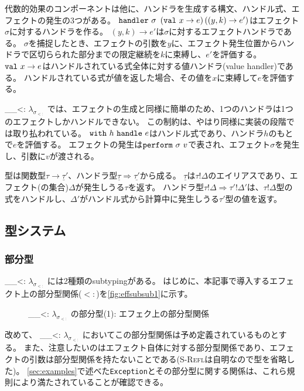 \documentclass{ltjsarticle}
\def\effsub{
  \ifmmode
    \lambda_{\sigma_{<:}}
  \else
    $\lambda_{\sigma_{<:}}$
  \fi
}
\begin{document}
代数的効果のコンポーネントは他に、ハンドラを生成する構文、ハンドル式、エフェクトの発生の3つがある。
$\handlerK \sigma\ \left(\valK x \rightarrow e\right) \left(\left(y, k\right) \rightarrow e'\right)$はエフェクト$\sigma$に対するハンドラを作る。
$\left(y, k\right)\rightarrow e'$は$\sigma$に対するエフェクトハンドラである。
$\sigma$を捕捉したとき、エフェクトの引数を$y$に、エフェクト発生位置からハンドラで区切らられた部分までの限定継続を$k$に束縛し、$e'$を評価する。
$\valK x \rightarrow e$はハンドルされている式全体に対する値ハンドラ(value handler)である。
ハンドルされている式が値を返した場合、その値を$x$に束縛して$e$を評価する。
\effsub{}では、エフェクトの生成と同様に簡単のため、1つのハンドラは1つのエフェクトしかハンドルできない。
この制約は、やはり同様に実装の段階では取り払われている。
$\withK h\ \handleK e$はハンドル式であり、ハンドラ$h$のもとで$e$を評価する。
エフェクトの発生は$\performK \sigma\ v$で表され、エフェクト$\sigma$を発生し、引数に$v$が渡される。

型は関数型$\tau\rightarrow\underline{\tau}'$、ハンドラ型$\underline{\tau}\Rightarrow\underline{\tau'}$から成る。
$\underline{\tau}$は$\tau!\Delta$のエイリアスであり、エフェクト(の集合)$\Delta$が発生しうる$\tau$を返す。
ハンドラ型$\tau!\Delta \Rightarrow\tau'!\Delta'$は、$\tau!\Delta$型の式をハンドルし、$\Delta'$がハンドル式から計算中に発生しうる$\tau'$型の値を返す。

\subsection{型システム}
\subsubsection{部分型}
\effsub{}には2種類のsubtypingがある。
はじめに、本記事で導入するエフェクト上の部分型関係($<:$)を\autoref{fig:effsubsub1}に示す。
\begin{figure}[ht]
  \centering
  \begin{framed}
      \infax[S-Refl]{
        \sigma <: \sigma
      }

  \end{framed}
  \caption{\effsub{}の部分型(1): エフェク上の部分型関係}
  \label{fig:effsubsub1}
\end{figure}
改めて、\effsub{}においてこの部分型関係は予め定義されているものとする。
また、注意したいのはエフェクト自体に対する部分型関係であり、エフェクトの引数は部分型関係を持たないことである(\textsc{S-Refl}は自明なので型を省略した)。
\autoref{sec:examples}で述べた\texttt{Exception}とその部分型に関する関係は、これら規則により満たされていることが確認できる。
\end{document}
